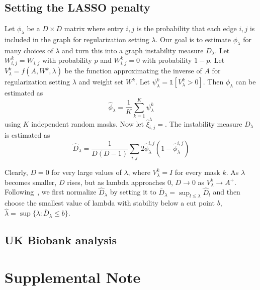 \documentclass{article}
\newcommand{\beginsupplement}{%
        \setcounter{table}{0}
        \renewcommand{\thetable}{S\arabic{table}}%
        \setcounter{figure}{0}
        \renewcommand{\thefigure}{S\arabic{figure}}%
     }
\begin{document}
\subsection{Setting the LASSO penalty}
Let $\phi_{\lambda}$ be a $D\times D$ matrix where entry $i, j$ is the probability that each edge
$i,j$ is included in the graph for regularization setting $\lambda$. Our goal is to
estimate $\phi_{\lambda}$ for many choices of $\lambda$ and
turn this into a graph instability measure $D_\lambda$.
Let $W^k_{i,j} = W_{i,j}$ with probability $p$ and $W^k_{i,j} = 0$ with
probability $1-p$. Let $V_{\lambda}^k = f(A, W^k, \lambda)$ be
 the function approximating the inverse of
$A$ for regularization setting
$\lambda$ and weight set $W^k$. Let $\psi^k_{\lambda} = \mathds{1}[V^k_{\lambda} > 0]$.
Then  $\phi_{\lambda}$ can be estimated as
\begin{equation}
\hat{\phi}_{\lambda} = \frac{1}{K} \sum_{k=1}^K \psi^{k}_{\lambda}
\end{equation}
using $K$ independent random masks. Now let
$\hat{\xi}_{i,j}^\lambda = $.
The instability measure $D_\lambda$ is estimated as~\cite{Liu2010}
\begin{equation}
\hat{D}_\lambda = \frac{1}{D(D-1)} \sum_{i, j} 2 \hat{\phi}^{i, j}_\lambda(1-\hat{\phi}^{i, j}_\lambda)
\end{equation}

Clearly, $D = 0$ for very large values of $\lambda$, where $V^k_\lambda = I$
for every mask $k$. As $\lambda$ becomes smaller, $D$ rises, but as lambda approaches $0$,
$D\rightarrow 0$ as $V^k_\lambda \rightarrow A^+$. Following~\cite{Liu2010},
we first normalize $\hat{D}_\lambda$ by setting it to
$\bar{D}_\lambda = \sup_{l \leq \lambda} \hat{D}_l$ and then choose the smallest
value of lambda with stability below a cut point $b$,
$\hat{\lambda} = \sup \{ \lambda : \bar{D}_\lambda \leq b \}$.

\subsection{UK Biobank analysis}




\beginsupplement
\section*{Supplemental Note}
\end{document}
